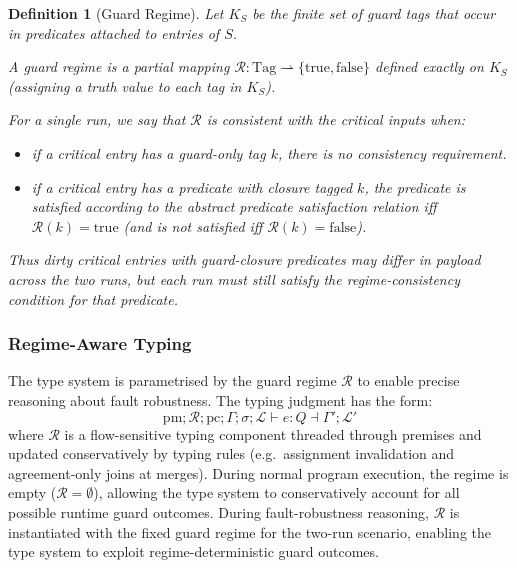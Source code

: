 \documentclass[12pt]{article}
\newtheorem{definition}{Definition}[section]
\begin{document}
\begin{definition}[Guard Regime]
Let $K_S$ be the finite set of guard tags that occur in predicates attached to
entries of $S$.

A \emph{guard regime} is a partial mapping $\mathcal{R} : \text{Tag} \rightharpoonup
\{\text{true},\text{false}\}$ defined exactly on $K_S$ (assigning a truth value to each
tag in $K_S$).

For a single run, we say that $\mathcal{R}$ is \emph{consistent} with the critical inputs when:
\begin{itemize}
  \item if a critical entry has a \emph{guard-only} tag $k$, there is no consistency requirement.
  \item if a critical entry has a predicate \emph{with closure} tagged $k$, the predicate
  is satisfied according to the abstract predicate satisfaction relation iff
  $\mathcal{R}(k)=\text{true}$ (and is not satisfied iff $\mathcal{R}(k)=\text{false}$).
\end{itemize}
Thus dirty critical entries with guard-closure predicates may differ in payload
across the two runs, but each run must still satisfy the regime-consistency
condition for that predicate.
\end{definition}

\subsubsection{Regime-Aware Typing}
\label{sec:regime-aware-typing}

The type system is parametrised by the guard regime $\mathcal{R}$ to enable
precise reasoning about fault robustness. The typing judgment has the form:
\[
  \text{pm} ; \mathcal{R} ; \text{pc} ; \Gamma ; \sigma ; \mathcal{L} \vdash e : Q \dashv \Gamma' ; \mathcal{L}'
\]
where $\mathcal{R}$ is a flow-sensitive typing component threaded through
premises and updated conservatively by typing rules (e.g.\ assignment
invalidation and agreement-only joins at merges). During normal program
execution, the regime is empty ($\mathcal{R} = \emptyset$), allowing the type
system to conservatively account for all possible runtime guard outcomes. During
fault-robustness reasoning, $\mathcal{R}$ is instantiated with the fixed guard
regime for the two-run scenario, enabling the type system to exploit
regime-deterministic guard outcomes.
\end{document}
